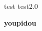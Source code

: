 \documentclass[10pt, a4paper]{article}
\begin{document}


{}
\setcounter{page}{1}

\section{}
test
test2.0


\textbf{youpidou}


\printbibliography
\end{document}
